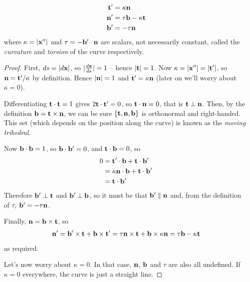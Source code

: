 \documentclass{../../template/note}
\begin{document}
    \begin{proposition}
        \begin{align*}
            \V t' &= \kappa \V n \\
            \V n' &= \tau \V b - \kappa \V t \\
            \V b' &= -\tau \V n
        \end{align*}
        where \(\kappa = |\V x''|\) and \(\tau = -\V b' \cdot \V n\) are scalars, not necessarily constant, called the \emph{curvature} and \emph{torsion} of the curve respectively.
    \end{proposition}
    
    \begin{proof}
        First, \(ds = |d \V x|\), so \(|\frac{d \V x}{ds}| = 1\) -- hence \(|\V t| = 1\). Now \(\kappa = |\V x''| = |\V t'|\), so \(\V n = \V t'/\kappa\) by definition. Hence \(|\V n| = 1\) and \(\V t' = \kappa \V n\) (later on we'll worry about \(\kappa = 0\)).

        Differentiating \(\V t \cdot \V t = 1\) gives \(2\V t \cdot \V t' = 0\), so \(\V t \cdot \V n = 0\), that is \(\V t \perp \V n\). Then, by the definition \(\V b = \V t \times \V n\), we can be sure \(\{\V t, \V n, \V b\}\) is orthonormal and right-handed. This set (which depends on the position along the curve) is known as the \emph{moving trihedral}.

        Now \(\V b \cdot \V b = 1\), so \(\V b \cdot \V b' = 0\), and \(\V t \cdot \V b = 0\), so 
        \begin{align*}
            0 &= \V t' \cdot \V b + \V t \cdot \V b' \\
            &= \kappa \V n \cdot \V b + \V t \cdot \V b' \\
            &= \V t \cdot \V b'
        \end{align*}
        Therefore \(\V b' \perp \V t\) and \(\V b' \perp \V b\), so it must be that \(\V b' \parallel \V n\) and, from the definition of \(\tau\), \(\V b' = -\tau \V n\).

        Finally, \(\V n = \V b \times \V t\), so
        \begin{align*}
            \V n' = \V b' \times \V t + \V b \times \V t' = \tau \V n \times \V t + \V b \times \kappa \V n = \tau \V b - \kappa \V t
        \end{align*}
        as required.

        Let's now worry about \(\kappa = 0\). In that case, \(\V n\), \(\V b\) and \(\tau\) are also all undefined. If \(\kappa = 0\) everywhere, the curve is just a straight line.
    \end{proof}
    
\end{document}
